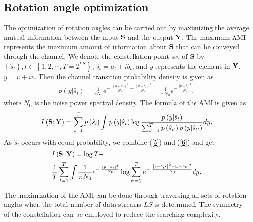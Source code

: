 \documentclass[conference]{IEEEtran}
\begin{document}
\subsection{Rotation angle optimization}
The optimization of rotation angles can be carried out by maximizing the average mutual information between the input ${\bf{S}}$ and the output ${\bf{Y}}$. The maximum AMI represents the maximum amount of information about ${\bf{S}}$ that can be conveyed through the channel. We denote the constellation point set of ${\bf{S}}$ by $\left\{ {{\hat s_t}} \right\},t \in \left\{ {1,2, \cdots ,T = {2^{LS}}} \right\}$, ${\hat s_t} = {a_t} + i{b_t}$, and $y$ represents the element in ${\bf{Y}}$, $y = u + iv$. Then the channel transition probability density is given as
\begin{equation}
\begin{aligned}
p(y|{\hat s_t}) = \frac{1}{{\pi {N_0}}}{e^{ - \;\frac{{{{\left( {u - {a_t}} \right)}^2}}}{{{N_0}}} - \frac{{{{\left( {v - {b_t}} \right)}^2}}}{{{N_0}}}}} = \frac{1}{{\pi {N_0}}}{e^{ - \;\frac{{{{\left| {y - {{\hat s}_t}} \right|}^2}}}{{{N_0}}}}}\label{5},
\end{aligned}
\end{equation}
where $N_0$ is the noise power spectral density. The formula of the AMI is given as
\begin{equation}
\begin{aligned}
{I}\left( {{\bf{S}};{\bf{Y}}} \right) = \sum\limits_{t = 1}^T {p\left( {{{\hat s}_t}} \right)} \int p \left( {y|{{\hat s}_t}} \right)\log \frac{{p\left( {y|{{\hat s}_t}} \right)}}{{\sum\nolimits_{t' = 1}^T {p\left( {{{\hat s}_{t'}}} \right)p\left( {y|{{\hat s}_{t'}}} \right)} }}dy\label{6},
\end{aligned}
\end{equation}
As $\hat s_t$ occurs with equal probability, we combine (\ref{5}) and (\ref{6}) and get
\begin{equation}
\begin{aligned}
&{I}\left( {\bf{S};\bf{Y}} \right) = \log T - \\
&\frac{1}{T}\sum\limits_{t = 1}^T {\int\frac{1}{{\pi {N_0}}}{e^{ - \;\frac{{{{\left| {y - {\hat s_t}} \right|}^2}}}{{{N_0}}}}}\log \sum\limits_{t' = 1}^T {{e^{ - \;\frac{{{{\left| {y - {\hat s_{t'}}} \right|}^2} - {{\left| {y - {\hat s_t}} \right|}^2}}}{{{N_0}}}}}} dy}\label{7}.
\end{aligned}
\end{equation}

The maximization of the AMI can be done through traversing all sets of rotation angles when the total number of data streams $LS$ is determined. The symmetry of the constellation can be employed to reduce the searching complexity.
\end{document}
